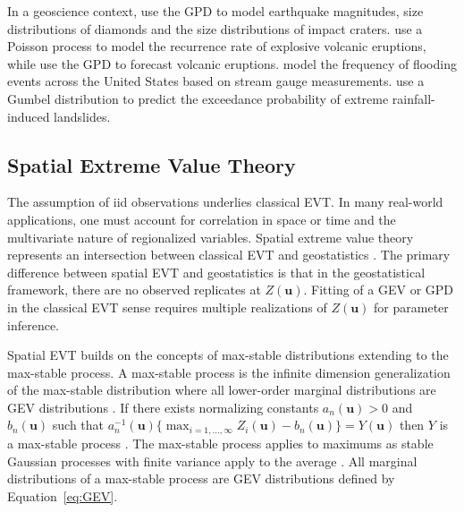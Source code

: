 In a geoscience context, \cite{caers1999statistics,caers1999statisticsa} use the \gls{GPD} to model earthquake magnitudes, size distributions of diamonds and the size distributions of impact craters. \cite{deligne2010recurrence} use a Poisson process to model the recurrence rate of explosive volcanic eruptions, while \cite{nguyen2023dynamic} use the \gls{GPD} to forecast volcanic eruptions. \cite{miniussi2020metastatistical} model the frequency of flooding events across the United States based on stream gauge measurements. \cite{lee2021temporal} use a Gumbel distribution to predict the exceedance probability of extreme rainfall-induced landslides.

\subsection{Spatial Extreme Value Theory}
\label{subsec:01spevt}

The assumption of \acrfull{iid} observations underlies classical \gls{EVT}. In many real-world applications, one must account for correlation in space or time and the multivariate nature of regionalized variables. Spatial extreme value theory represents an intersection between classical \gls{EVT} and geostatistics \citep{neves2015geostatistical}. The primary difference between spatial \gls{EVT} and geostatistics is that in the geostatistical framework, there are no observed replicates at $Z(\mathbf{u})$. Fitting of a \gls{GEV} or \gls{GPD} in the classical \gls{EVT} sense requires multiple realizations of $Z(\mathbf{u})$ for parameter inference.

Spatial \gls{EVT} builds on the concepts of max-stable distributions extending to the max-stable process. A max-stable process is the infinite dimension generalization of the max-stable distribution where all lower-order marginal distributions are \gls{GEV} distributions \citep{schlather2003dependence}. If there exists normalizing constants $a_n(\mathbf{u}) > 0$ and $b_n(\mathbf{u})$ such that $a_n^{-1}(\mathbf{u})\{\max_{i=1,...,\infty} Z_i(\mathbf{u}) - b_n(\mathbf{u})\} = Y(\mathbf{u})$ then $Y$ is a max-stable process \citep{dehaan2007extreme}. The max-stable process applies to maximums as stable Gaussian processes with finite variance apply to the average \citep{chiles2012geostatistics}. All marginal distributions of a max-stable process are \gls{GEV} distributions defined by Equation~\ref{eq:GEV}.


